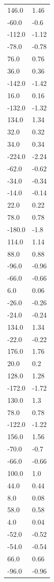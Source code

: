 \begin{longtable}{ll}
146.0 & 1.46 \\
-60.0 & -0.6 \\
-112.0 & -1.12 \\
-78.0 & -0.78 \\
76.0 & 0.76 \\
36.0 & 0.36 \\
-142.0 & -1.42 \\
16.0 & 0.16 \\
-132.0 & -1.32 \\
134.0 & 1.34 \\
32.0 & 0.32 \\
34.0 & 0.34 \\
-224.0 & -2.24 \\
-62.0 & -0.62 \\
-34.0 & -0.34 \\
-14.0 & -0.14 \\
22.0 & 0.22 \\
78.0 & 0.78 \\
-180.0 & -1.8 \\
114.0 & 1.14 \\
88.0 & 0.88 \\
-96.0 & -0.96 \\
-66.0 & -0.66 \\
6.0 & 0.06 \\
-26.0 & -0.26 \\
-24.0 & -0.24 \\
134.0 & 1.34 \\
-22.0 & -0.22 \\
176.0 & 1.76 \\
20.0 & 0.2 \\
128.0 & 1.28 \\
-172.0 & -1.72 \\
130.0 & 1.3 \\
78.0 & 0.78 \\
-122.0 & -1.22 \\
156.0 & 1.56 \\
-70.0 & -0.7 \\
-66.0 & -0.66 \\
100.0 & 1.0 \\
44.0 & 0.44 \\
8.0 & 0.08 \\
58.0 & 0.58 \\
4.0 & 0.04 \\
-52.0 & -0.52 \\
-54.0 & -0.54 \\
66.0 & 0.66 \\
-96.0 & -0.96 \\

\end{longtable}
